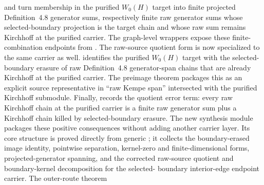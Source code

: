 \documentclass[11pt]{article}
\begin{document}
and
turn membership in the purified \(W_0(H)\) target into finite projected
Definition~4.8 generator sums, respectively finite raw generator sums whose
selected-boundary projection is the target chain and whose raw sum remains
Kirchhoff at the purified carrier.  The graph-level wrappers expose these
finite-combination endpoints from
.
The raw-source quotient form is now specialized to the same carrier as well.
identifies the purified \(W_0(H)\) target with the selected-boundary erasure of
raw Definition~4.8 generator-span chains that are already Kirchhoff at the
purified carrier.  The preimage theorem
packages this as an explicit source representative in
``raw Kempe span'' intersected with the purified Kirchhoff submodule.  Finally,
records the quotient error term: every raw Kirchhoff chain at the purified
carrier is a finite raw generator sum plus a Kirchhoff chain killed by
selected-boundary erasure.
The new synthesis module  packages these
positive consequences without adding another carrier layer.  Its core
structure  is proved directly from generic
; it collects
the boundary-erased image identity, pointwise separation, kernel-zero and
finite-dimensional forms, projected-generator spanning, and the corrected
raw-source quotient and boundary-kernel decomposition for the selected-
boundary interior-edge endpoint carrier.  The outer-route theorem
\end{document}
